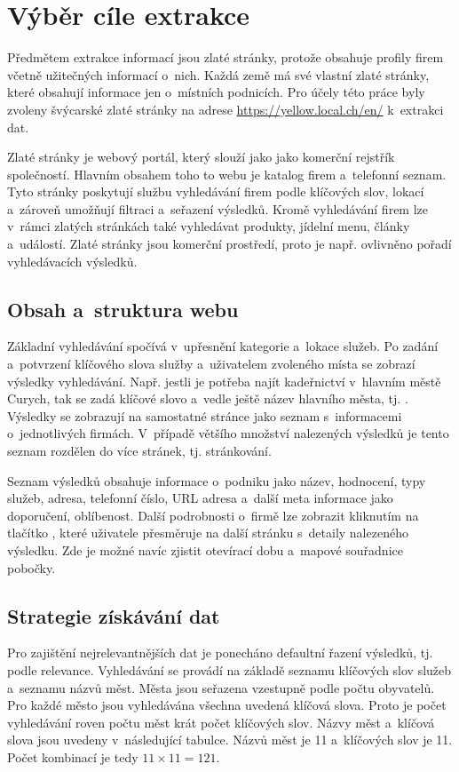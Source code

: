 \documentclass[11pt,a4paper]{article}
\begin{document}
\section{Výběr cíle extrakce}
Předmětem extrakce informací jsou zlaté stránky, protože obsahuje profily firem včetně užitečných informací o~nich. Každá země má své vlastní zlaté stránky, které obsahují informace jen o~místních podnicích. Pro účely této práce byly zvoleny švýcarské zlaté stránky na adrese \url{https://yellow.local.ch/en/} k~extrakci dat.

Zlaté stránky je webový portál, který slouží jako jako komerční rejstřík společností. Hlavním obsahem toho to webu je katalog firem a~telefonní seznam. Tyto stránky poskytují službu vyhledávání firem podle klíčových slov, lokací a~zároveň umožňují filtraci a~seřazení výsledků. Kromě vyhledávání firem lze v~rámci zlatých stránkách také vyhledávat produkty, jídelní menu, články a~událostí. Zlaté stránky jsou komerční prostředí, proto je např. ovlivněno pořadí vyhledávacích výsledků.

\subsection{Obsah a~struktura webu}
Základní vyhledávání spočívá v~upřesnění kategorie a~lokace služeb. Po zadání a~potvrzení klíčového slova služby a~uživatelem zvoleného místa se zobrazí výsledky vyhledávání. Např. jestli je potřeba najít kadeřnictví v~hlavním městě Curych, tak se zadá klíčové slovo  a~vedle ještě název hlavního města, tj. . Výsledky se zobrazují na samostatné stránce jako seznam s~informacemi o~jednotlivých firmách. V~případě většího množství nalezených výsledků je tento seznam rozdělen do více stránek, tj. stránkování.

Seznam výsledků obsahuje informace o~podniku jako název, hodnocení, typy služeb, adresa, telefonní číslo, URL adresa a~další meta informace jako doporučení, oblíbenost. Další podrobnosti o~firmě lze zobrazit kliknutím na tlačítko , které uživatele přesměruje na další stránku s~detaily nalezeného výsledku. Zde je možné navíc zjistit otevírací dobu a~mapové souřadnice pobočky.

\subsection{Strategie získávání dat}
Pro zajištění nejrelevantnějších dat je ponecháno defaultní řazení výsledků, tj. podle relevance. Vyhledávání se provádí na základě seznamu klíčových slov služeb a~seznamu názvů měst. Města jsou seřazena vzestupně podle počtu obyvatelů. Pro každé město jsou vyhledávána všechna uvedená klíčová slova. Proto je počet vyhledávání roven počtu měst krát počet klíčových slov. Názvy měst a~klíčová slova jsou uvedeny v~následující tabulce. Názvů měst je 11 a~klíčových slov je 11. Počet kombinací je tedy $ 11 \times 11 = 121 $.
\end{document}
